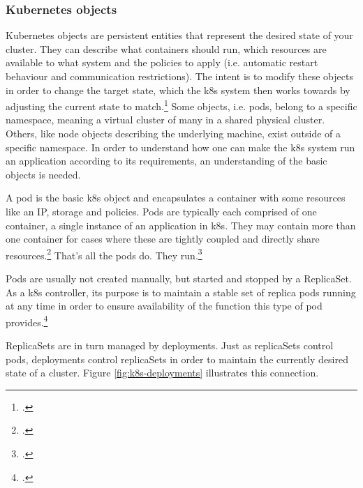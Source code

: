 
\subsubsection{Kubernetes objects}
Kubernetes objects are persistent entities that represent the desired state of your cluster. They can describe what containers should run, which resources are available to what system and the policies to apply (i.e. automatic restart behaviour and communication restrictions).
The intent is to modify these objects in order to change the target state, which the \gls{k8s} system then works towards by adjusting the current state to match.\footcite{k8sObjects}
Some objects, i.e. pods, belong to a specific namespace, meaning a virtual cluster of many in a shared physical cluster. Others, like node objects describing the underlying machine, exist outside of a specific namespace.
In order to understand how one can make the \gls{k8s} system run an application according to its requirements, an understanding of the basic objects is needed.

A pod is the basic \gls{k8s} object and encapsulates a container with some resources like an IP, storage and policies. Pods are typically each comprised of one container, a single instance of an application in \gls{k8s}. They may contain more than one container for cases where these are tightly coupled and directly share resources.\footcite{k8sPods}
That's all the pods do. They run.\footcite{phippy}

Pods are usually not created manually, but started and stopped by a ReplicaSet. As a \gls{k8s} controller, its purpose is to maintain a stable set of replica pods running at any time in order to ensure availability of the function this type of pod provides.\footcite{k8sReplicaSets}

ReplicaSets are in turn managed by deployments. Just as replicaSets control pods, deployments control replicaSets in order to maintain the currently desired state of a cluster.
Figure \ref{fig:k8s-deployments} illustrates this connection.

